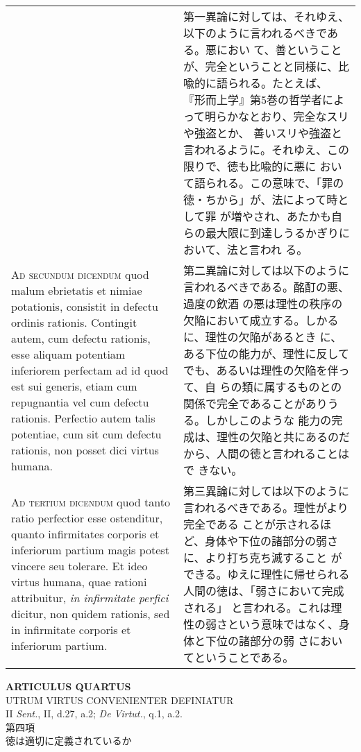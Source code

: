 \documentclass[10pt]{jsarticle}
\begin{document}
\begin{longtable}{p{21em}p{21em}}
&

第一異論に対しては、それゆえ、以下のように言われるべきである。悪におい
て、善ということが、完全ということと同様に、比喩的に語られる。たとえば、
『形而上学』第5巻の哲学者によって明らかなとおり、完全なスリや強盗とか、
善いスリや強盗と言われるように。それゆえ、この限りで、徳も比喩的に悪に
おいて語られる。この意味で、「罪の徳・ちから」が、法によって時として罪
が増やされ、あたかも自らの最大限に到達しうるかぎりにおいて、法と言われ
る。


\\



{\scshape Ad secundum dicendum} quod malum ebrietatis et nimiae
potationis, consistit in defectu ordinis rationis. Contingit autem,
cum defectu rationis, esse aliquam potentiam inferiorem perfectam ad
id quod est sui generis, etiam cum repugnantia vel cum defectu
rationis. Perfectio autem talis potentiae, cum sit cum defectu
rationis, non posset dici virtus humana.

&

第二異論に対しては以下のように言われるべきである。酩酊の悪、過度の飲酒
の悪は理性の秩序の欠陥において成立する。しかるに、理性の欠陥があるとき
に、ある下位の能力が、理性に反してでも、あるいは理性の欠陥を伴って、自
らの類に属するものとの関係で完全であることがありうる。しかしこのような
能力の完成は、理性の欠陥と共にあるのだから、人間の徳と言われることはで
きない。

\\



{\scshape Ad tertium dicendum} quod tanto ratio perfectior esse
ostenditur, quanto infirmitates corporis et inferiorum partium magis
potest vincere seu tolerare. Et ideo virtus humana, quae rationi
attribuitur, {\itshape in infirmitate perfici} dicitur, non quidem
rationis, sed in infirmitate corporis et inferiorum partium.

&

第三異論に対しては以下のように言われるべきである。理性がより完全である
ことが示されるほど、身体や下位の諸部分の弱さに、より打ち克ち滅すること
ができる。ゆえに理性に帰せられる人間の徳は、「弱さにおいて完成される」
と言われる。これは理性の弱さという意味ではなく、身体と下位の諸部分の弱
さにおいてということである。


\end{longtable}
\newpage



\begin{center}
{\Large {\bf ARTICULUS QUARTUS}}\\
{\large UTRUM VIRTUS CONVENIENTER DEFINIATUR}\\
{\footnotesize II {\itshape Sent.}, II, d.27, a.2; {\itshape De Virtut.}, q.1, a.2.}\\
{\Large 第四項\\徳は適切に定義されているか}
\end{center}
\end{document}
